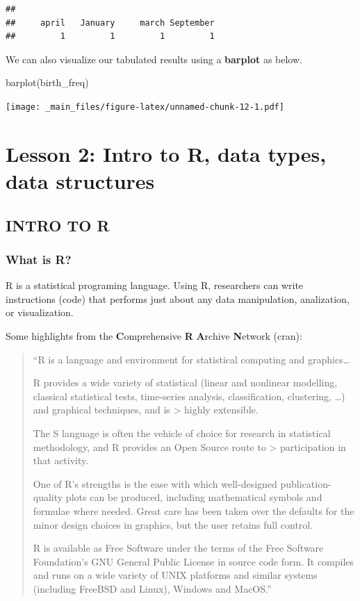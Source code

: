 \documentclass[
]{book}
\newenvironment{Shaded}{\begin{snugshade}}{\end{snugshade}}
\newcommand{\FunctionTok}[1]{\textcolor[rgb]{0.00,0.00,0.00}{#1}}
\newcommand{\NormalTok}[1]{#1}
\begin{document}
\begin{verbatim}
## 
##     april   January     march September 
##         1         1         1         1
\end{verbatim}

We can also visualize our tabulated results using a \textbf{barplot} as below.

\begin{Shaded}
\begin{Highlighting}[]
\FunctionTok{barplot}\NormalTok{(birth\_freq)}
\end{Highlighting}
\end{Shaded}

\texttt{[image: \_main\_files/figure-latex/unnamed-chunk-12-1.pdf]}

\hypertarget{lesson-2-intro-to-r-data-types-data-structures}{%
\chapter{Lesson 2: Intro to R, data types, data structures}\label{lesson-2-intro-to-r-data-types-data-structures}}

\hypertarget{intro-to-r}{%
\section{INTRO TO R}\label{intro-to-r}}

\hypertarget{what-is-r}{%
\subsection{What is R?}\label{what-is-r}}

R is a statistical programing language. Using R, researchers can write instructions (code) that performs just about any data manipulation, analization, or visualization.

Some highlights from the \textbf{C}omprehensive \textbf{R} \textbf{A}rchive \textbf{N}etwork (cran):

\begin{quote}
``R is a language and environment for statistical computing and
graphics\ldots{}

R provides a wide variety of statistical (linear and nonlinear
modelling, classical statistical tests, time-series analysis,
classification, clustering, \ldots) and graphical techniques, and is \textgreater{} highly extensible.

The S language is often the vehicle of choice for research in
statistical methodology, and R provides an Open Source route to \textgreater{} participation in that activity.

One of R's strengths is the ease with which well-designed
publication-quality plots can be produced, including
mathematical symbols and formulae where needed. Great care has
been taken over the defaults for the minor design choices in
graphics, but the user retains full control.

R is available as Free Software under the terms of the Free
Software Foundation's GNU General Public License in source code
form. It compiles and runs on a wide variety of UNIX platforms
and similar systems (including FreeBSD and Linux), Windows and
MacOS.''
\end{quote}
\end{document}
